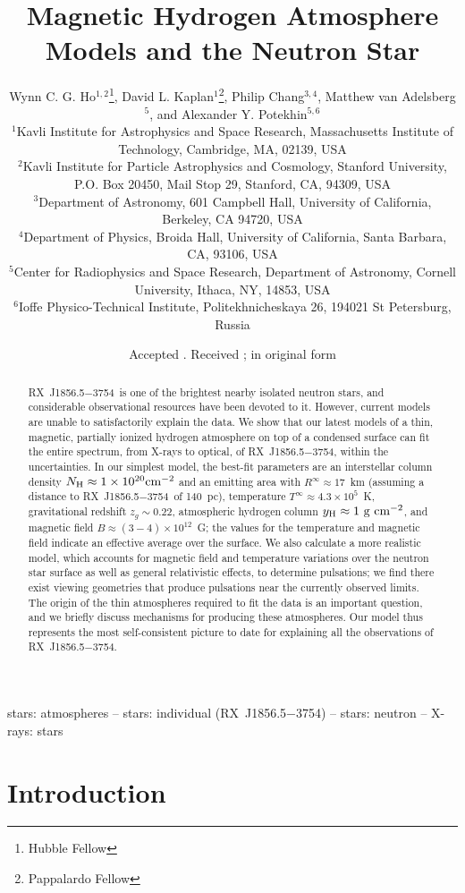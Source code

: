 \documentclass[useAMS,usegraphicx]{mn2e}
\title[Hydrogen Atmospheres and \rxjw]{Magnetic Hydrogen Atmosphere Models
and the Neutron Star \rxjw}
\author[Ho, Kaplan, Chang, van Adelsberg, \& Potekhin]{Wynn C. G.
Ho$^{1,2}$\thanks{Hubble Fellow},
David L. Kaplan$^{1}$\thanks{Pappalardo Fellow},
Philip Chang$^{3,4}$,
\newauthor
Matthew van Adelsberg$^{5}$,
and Alexander Y. Potekhin$^{5,6}$ \\
$^{1}$Kavli Institute for Astrophysics and Space Research,
Massachusetts Institute of Technology, Cambridge, MA, 02139, USA \\
$^{2}$Kavli Institute for Particle Astrophysics and Cosmology,
Stanford University, P.O. Box 20450, Mail Stop 29, Stanford, CA, 94309, USA \\
$^{3}$Department of Astronomy, 601 Campbell Hall, University of California,
Berkeley, CA 94720, USA \\
$^{4}$Department of Physics, Broida Hall, University of California,
Santa Barbara, CA, 93106, USA \\
$^{5}$Center for Radiophysics and Space Research, Department of Astronomy,
Cornell University, Ithaca, NY, 14853, USA \\
$^{6}$Ioffe Physico-Technical Institute, Politekhnicheskaya 26,
194021 St Petersburg, Russia \\
}
\newcommand{\rxjw}{RX~J1856.5$-$3754}
\newcommand{\zg}{z_g}
\newcommand{\ycol}{y_{\rm H}}
\newcommand{\nh}{\ensuremath{N_{\rm H}}}
\newcommand{\tinfty}{\ensuremath{T^{\infty}}}
\newcommand{\rinfty}{\ensuremath{R^{\infty}}}
\begin{document}
\date{Accepted . Received ; in original form}

\pagerange{\pageref{firstpage}--\pageref{lastpage}} 

\maketitle

\label{firstpage}

\begin{abstract}
\rxjw\ is one of the brightest nearby isolated neutron stars,
and considerable observational resources have been devoted to it.
However, current models are unable to satisfactorily explain the data.
We show that our latest models of a thin, magnetic, partially ionized hydrogen
atmosphere on top of a condensed surface can fit the entire spectrum,
from X-rays to optical, of \rxjw, within the uncertainties.
In our simplest model, the best-fit parameters are
an interstellar column density $\nh\approx 1\times 10^{20}\mbox{cm$^{-2}$}$
and an emitting area with $\rinfty\approx 17$~km (assuming
a distance to \rxjw\ of 140~pc), temperature $\tinfty\approx 4.3\times
10^5$~K, gravitational redshift $\zg\sim 0.22$, atmospheric hydrogen
column $\ycol\approx 1\mbox{ g cm$^{-2}$}$, and magnetic field
$B\approx (3-4)\times 10^{12}$~G;
the values for the temperature and magnetic field indicate an
effective average over the surface.  We also calculate a more realistic
model, which accounts for magnetic field and temperature variations
over the neutron star surface as well as general relativistic effects,
to determine pulsations;  we find there exist viewing geometries that
produce pulsations near the currently observed limits.
The origin of the thin atmospheres required to fit the data is an
important question, and we briefly discuss mechanisms for producing
these atmospheres.  Our model thus represents the most self-consistent
picture to date for explaining all the observations of \rxjw.
\end{abstract}

\begin{keywords}
stars: atmospheres -- stars: individual (\rxjw) -- stars: neutron --
X-rays: stars
\end{keywords}

\section{Introduction} \label{sec:intro}
\end{document}
